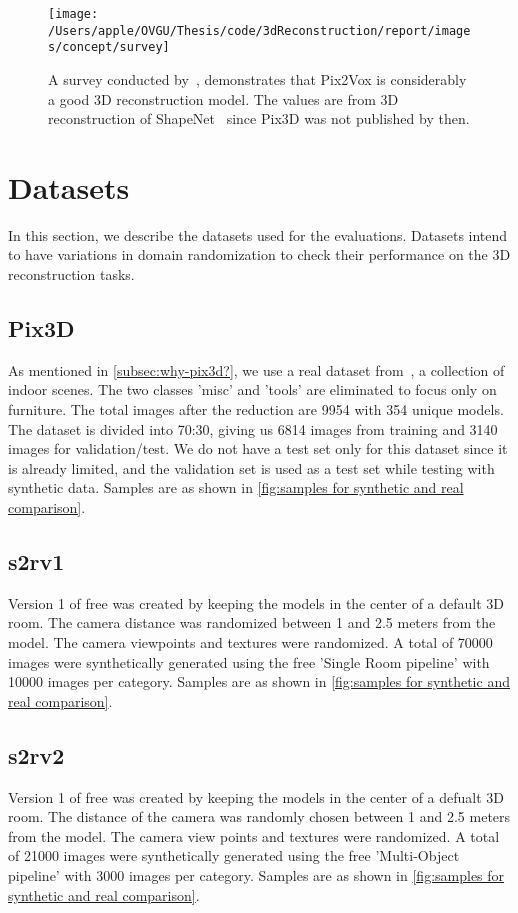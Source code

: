 \begin{figure}[ht]
    \centering
    \texttt{[image: /Users/apple/OVGU/Thesis/code/3dReconstruction/report/images/concept/survey]}
    \caption{A survey conducted by~\cite{Han2021ImageBased3O}, demonstrates that Pix2Vox is considerably a good 3D reconstruction model.
    The values are from 3D reconstruction of ShapeNet~\cite{shapenet2015} since Pix3D was not published by then.}
    \label{fig:survey on 3d reconstruction}
\end{figure}


\section{Datasets}\label{sec:datasets}
In this section, we describe the datasets used for the evaluations.
Datasets intend to have variations in domain randomization to check their performance on the 3D reconstruction tasks.

\subsection{Pix3D}\label{subsec:pix3d}
As mentioned in \autoref{subsec:why-pix3d?}, we use a real dataset from~\cite{Sun2018}, a collection of indoor scenes.
The two classes ’misc’ and ’tools’ are eliminated to focus only on furniture.
The total images after the reduction are 9954 with 354 unique models.
The dataset is divided into 70:30, giving us 6814 images from training and 3140 images for validation/test.
We do not have a test set only for this dataset since it is already limited, and the validation set is used as a test set while testing with synthetic data.
Samples are as shown in \autoref{fig:samples for synthetic and real comparison}.

\subsection{\gls{s2rv1}}\label{subsec:gls{free}-version-1}
Version 1 of \gls{free} was created by keeping the models in the center of a default 3D room.
The camera distance was randomized between 1 and 2.5 meters from the model.
The camera viewpoints and textures were randomized.
A total of 70000 images were synthetically generated using the \gls{free} 'Single Room pipeline' with 10000 images per category.
Samples are as shown in \autoref{fig:samples for synthetic and real comparison}.

\subsection{\gls{s2rv2}}\label{subsec:gls{free}-version-2}
Version 1 of \gls{free} was created by keeping the models in the center of a defualt 3D room.
The distance of the camera was randomly chosen between 1 and 2.5 meters from the model.
The camera view points and textures were randomized.
A total of 21000 images were synthetically generated using the \gls{free} 'Multi-Object pipeline' with 3000 images per category.
Samples are as shown in \autoref{fig:samples for synthetic and real comparison}.

